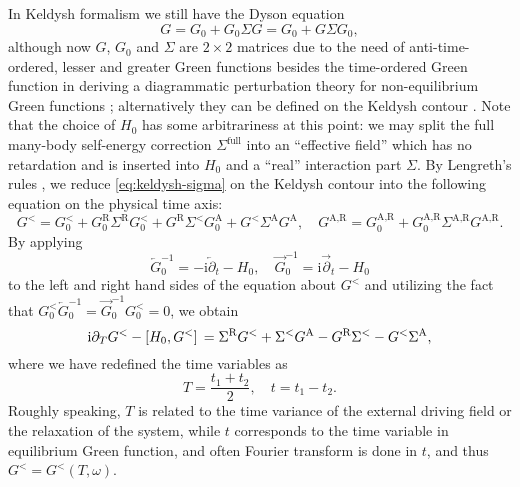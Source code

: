 \documentclass[hyperref, a4paper]{article}
\newcommand*{\ii}{\mathrm{i}}
\begin{document}
In Keldysh formalism we still have the Dyson equation
\begin{equation}
    G = G_0 + G_0 \Sigma G = G_0 + G \Sigma G_0,
    \label{eq:keldysh-sigma}
\end{equation}
although now $G$, $G_0$ and $\Sigma$
are $2 \times 2$ matrices
due to the need of anti-time-ordered, lesser and greater Green functions 
besides the time-ordered Green function 
in deriving a diagrammatic perturbation theory 
for non-equilibrium Green functions \cite{lifschitz1983physical};
alternatively they can be defined on the Keldysh contour \cite{haug2008quantum}.
Note that the choice of $H_0$ has some arbitrariness at this point:
we may split the full many-body self-energy correction $\Sigma^{\text{full}}$
into an ``effective field'' which has no retardation and is inserted into $H_0$
and a ``real'' interaction part $\Sigma$.
By Lengreth's rules \cite{haug2008quantum},
we reduce \eqref{eq:keldysh-sigma} on the Keldysh contour 
into the following equation on the physical time axis:
\begin{equation}
    G^< = G^<_0 + G^{\text{R}}_0 \Sigma^{\text{R}} G^{<}_0
    + G^{\text{R}} \Sigma^{<} G^{\text{A}}_0 
    + G^{<} \Sigma^{\text{A}} G^\text{A} , \quad 
    G^{\text{A}, \text{R}} = G^{\text{A}, \text{R}}_0 + G^{\text{A}, \text{R}}_0 \Sigma^{\text{A}, \text{R}} G^{\text{A}, \text{R}}.
\end{equation}
By applying 
\begin{equation}
    \overleftarrow{G}_0^{-1} = - \ii \overleftarrow{\partial}_t - H_0 , \quad 
    \overrightarrow{G}_0^{-1} = \ii \overrightarrow{\partial}_t - H_0
\end{equation}
to the left and right hand sides of the equation about $G^<$
and utilizing the fact that $G_0^< \overleftarrow{G}_0^{-1} = \overrightarrow{G}_0^{-1} G_0^< = 0$,
we obtain 
\begin{equation}
    \ii \partial_T G^< - \comm*{H_0}{G^<} = 
    \Sigma^{\text{R}} G^< + \Sigma^< G^{\text{A}} - G^{\text{R}} \Sigma^< - G^< \Sigma^{\text{A}},
    \label{eq:gkb}
\end{equation}
where we have redefined the time variables as 
\begin{equation}
    T = \frac{t_1 + t_2}{2}, \quad t = t_1 - t_2.
\end{equation}
Roughly speaking, $T$ is related to the time variance 
of the external driving field or the relaxation of the system,
while $t$ corresponds to the time variable 
in equilibrium Green function,
and often Fourier transform is done in $t$,
and thus $G^< = G^<(T, \omega)$. 
\end{document}
